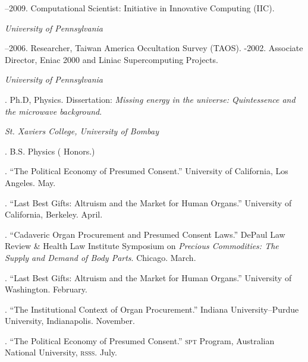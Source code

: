 \documentclass[11pt]{article}
\begin{document}
--2009. Computational Scientist: Initiative in Innovative Computing (IIC).

\medskip

\noindent\emph{University of Pennsylvania \vspace{0.01in}}

--2006. Researcher, Taiwan America Occultation Survey (TAOS).
-2002. Associate Director, Eniac 2000 and Liniac Supercomputing Projects.

\bigskip



\noindent\emph{University of Pennsylvania \vspace{0.01in}}

. Ph.D, Physics.  Dissertation: \emph{Missing energy in the universe: Quintessence and the microwave background}. 
  
\medskip
\noindent\emph{St. Xaviers College, University of Bombay\vspace{0.02in}}

. B.S. Physics ( Honors.) 

\bigskip
 
\medskip 
. ``The Political Economy of Presumed Consent.'' University of California, Los Angeles. May.

. ``Last Best Gifts: Altruism and the Market for Human Organs.''
University of California, Berkeley. April.

. ``Cadaveric Organ Procurement and Presumed Consent Laws.'' DePaul
Law Review \& Health Law Institute Symposium on \emph{Precious Commodities: The
Supply and Demand of Body Parts}. Chicago. March. 

. ``Last Best Gifts: Altruism and the Market for Human 
Organs.'' University of Washington. February. 

. ``The Institutional Context of Organ Procurement.'' Indiana
University--Purdue University, Indianapolis. November.

. ``The Political Economy of Presumed Consent.'' \textsc{spt} Program,
Australian National University, \textsc{rsss}. July. 
\end{document}
